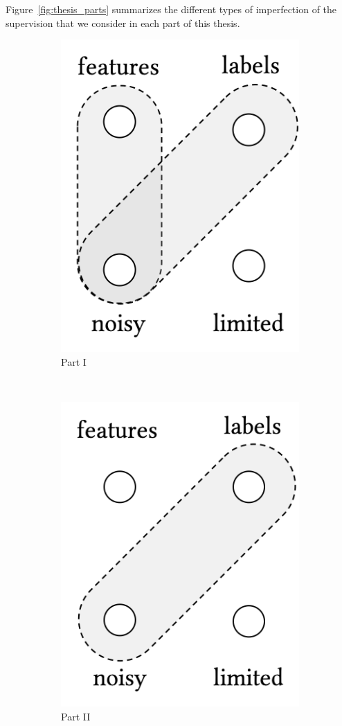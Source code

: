 Figure~\ref{fig:thesis_parts} summarizes the different types of imperfection of the supervision that we consider in each part of this thesis.
\begin{figure}[t]
    \centering
    \begin{subfigure}[b]{0.32\textwidth}
    \centering
        \includegraphics[width=0.55\linewidth]{01-introduction/figs_and_tables/fig_p1.png}
        \caption{\label{fig:p1}Part I}
    \end{subfigure}
        ~ 
    \begin{subfigure}[b]{0.32\textwidth}
    \centering
        \includegraphics[width=0.55\linewidth]{01-introduction/figs_and_tables/fig_p2.png}
        \caption{\label{fig:p2}Part II}
    \end{subfigure}
        ~ 
    \begin{subfigure}[b]{0.32\textwidth}

\end{subfigure}
\end{figure}
